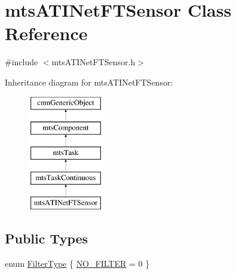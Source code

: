 \hypertarget{classmts_a_t_i_net_f_t_sensor}{\section{mts\-A\-T\-I\-Net\-F\-T\-Sensor Class Reference}
\label{classmts_a_t_i_net_f_t_sensor}
}


{\ttfamily \#include $<$mts\-A\-T\-I\-Net\-F\-T\-Sensor.\-h$>$}

Inheritance diagram for mts\-A\-T\-I\-Net\-F\-T\-Sensor\-:\begin{figure}[H]
\begin{center}
\leavevmode
\includegraphics[height=5.000000cm]{d3/d28/classmts_a_t_i_net_f_t_sensor}
\end{center}
\end{figure}
\subsection*{Public Types}
\begin{DoxyCompactItemize}
\item 
enum \hyperlink{classmts_a_t_i_net_f_t_sensor_ac0b6761b0eee98b4413c5a153865c2ea}{Filter\-Type} \{ \hyperlink{classmts_a_t_i_net_f_t_sensor_ac0b6761b0eee98b4413c5a153865c2eaab52493358557bae4766830c60064eec9}{N\-O\-\_\-\-F\-I\-L\-T\-E\-R} = 0
 \}
\end{DoxyCompactItemize}
